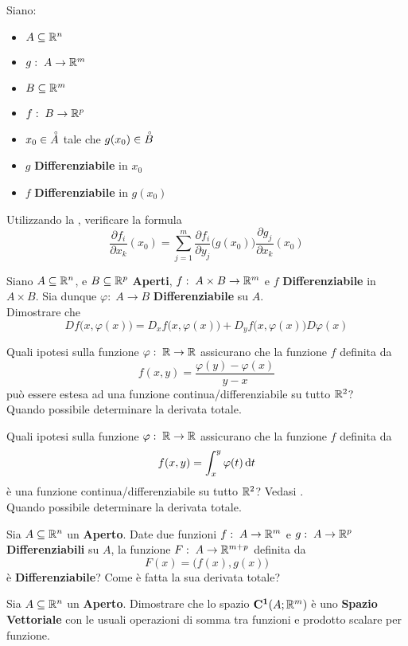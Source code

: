 \begin{exercise}
	Siano:
	\begin{itemize}[noitemsep]
		\item $A \subseteq \mathbb{R}^n$
		\item $g:\; A \to \mathbb{R}^m$
		\item $B \subseteq \mathbb{R}^m$
		\item $f:\; B \to \mathbb{R}^p$
		\item $x_0 \in \accentset{\circ}{A}$ tale che $g(x_0) \in \accentset{\circ}{B}$
		\item $g$ \textbf{Differenziabile} in $x_0$
		\item $f$ \textbf{Differenziabile} in $g(x_0)$
	\end{itemize}
	Utilizzando la , verificare la formula
	\[
		\frac{\partial f_i}{\partial x_k}(x_0) = \sum\limits_{j = 1}^{m} \frac{\partial f_i}{\partial y_j}\bigl( g(x_0) \bigr) \frac{\partial g_j}{\partial x_k}(x_0)
	\]
\end{exercise}
\begin{exercise}
	\label{ex:diff_funz_comp}
	Siano $A \subseteq \mathbb{R}^n$, e $B \subseteq \mathbb{R}^p$ \textbf{Aperti}, $f:\; A \times B \to \mathbb{R}^m$ e $f$ \textbf{Differenziabile} in $A \times B$. Sia dunque $\varphi:\; A \to B$ \textbf{Differenziabile} su $A$.\\
	Dimostrare che
	\[Df \bigl( x, \varphi(x) \bigr) = D_x f \bigl( x, \varphi(x) \bigr) + D_y f \bigl( x, \varphi(x) \bigr) D\varphi(x)\]
\end{exercise}
\begin{exercise}
	Quali ipotesi sulla funzione $\varphi:\; \mathbb{R} \to \mathbb{R}$ assicurano che la funzione $f$ definita da
	\[f(x,y) = \frac{\varphi(y) - \varphi(x)}{y - x}\]
	può essere estesa ad una funzione continua/differenziabile su tutto $\mathbb{R}^2$?\\
	Quando possibile determinare la derivata totale.
\end{exercise}
\begin{exercise}
	Quali ipotesi sulla funzione $\varphi:\; \mathbb{R} \to \mathbb{R}$ assicurano che la funzione $f$ definita da
	\[f(x,y) = \int_x^y \varphi(t) \,\mathrm{d}{t}\]
	è una funzione continua/differenziabile su tutto $\mathbb{R}^2$? Vedasi .\\
	Quando possibile determinare la derivata totale.
\end{exercise}
\begin{exercise}
	Sia $A \subseteq \mathbb{R}^n$ un \textbf{Aperto}. Date due funzioni $f:\; A \to \mathbb{R}^m$ e $g:\; A \to \mathbb{R}^p$ \textbf{Differenziabili} su $A$, la funzione $F:\; A \to \mathbb{R}^{m + p}$ definita da
	\[F(x) = \bigl( f(x), g(x) \bigr)\]
	è \textbf{Differenziabile}? Come è fatta la sua derivata totale?
\end{exercise}
\begin{exercise}
	Sia $A \subseteq \mathbb{R}^n$ un \textbf{Aperto}. Dimostrare che lo spazio $\mathbf{C^{1}}(A; \mathbb{R}^m)$ è uno \textbf{Spazio Vettoriale} con le usuali operazioni di somma tra funzioni e prodotto scalare per funzione.
\end{exercise}

